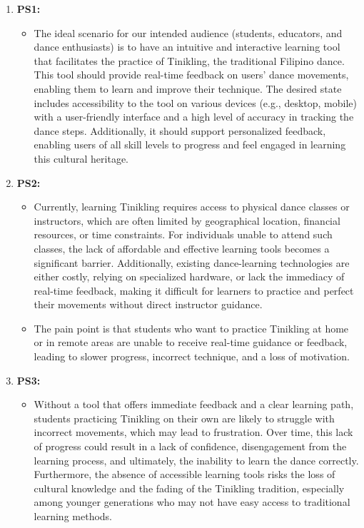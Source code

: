 \begin{enumerate}
    \item \textbf{PS1: }
    \begin{itemize}
        \item The ideal scenario for our intended audience (students, educators, and dance enthusiasts) is to have an intuitive and interactive learning tool that facilitates the practice of Tinikling, the traditional Filipino dance. This tool should provide real-time feedback on users' dance movements, enabling them to learn and improve their technique. The desired state includes accessibility to the tool on various devices (e.g., desktop, mobile) with a user-friendly interface and a high level of accuracy in tracking the dance steps. Additionally, it should support personalized feedback, enabling users of all skill levels to progress and feel engaged in learning this cultural heritage.
    \end{itemize}
    
    \item \textbf{PS2:}
    \begin{itemize}
        \item Currently, learning Tinikling requires access to physical dance classes or instructors, which are often limited by geographical location, financial resources, or time constraints. For individuals unable to attend such classes, the lack of affordable and effective learning tools becomes a significant barrier. Additionally, existing dance-learning technologies are either costly, relying on specialized hardware, or lack the immediacy of real-time feedback, making it difficult for learners to practice and perfect their movements without direct instructor guidance.
        \item The pain point is that students who want to practice Tinikling at home or in remote areas are unable to receive real-time guidance or feedback, leading to slower progress, incorrect technique, and a loss of motivation.
    \end{itemize}
    
    \item \textbf{PS3: }
    \begin{itemize}
        \item Without a tool that offers immediate feedback and a clear learning path, students practicing Tinikling on their own are likely to struggle with incorrect movements, which may lead to frustration. Over time, this lack of progress could result in a lack of confidence, disengagement from the learning process, and ultimately, the inability to learn the dance correctly. Furthermore, the absence of accessible learning tools risks the loss of cultural knowledge and the fading of the Tinikling tradition, especially among younger generations who may not have easy access to traditional learning methods.
    \end{itemize}
\end{enumerate}

